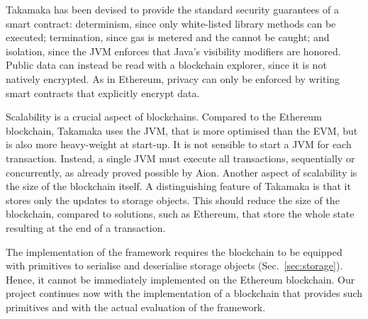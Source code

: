 \documentclass[10pt]{llncs}
\def\codesize{}
\def\<#1>{\codeid{#1}}
\newcommand{\codeid}[1]{\ifmmode{\mbox{\codesize\ttfamily{#1}}}\else{\codesize\ttfamily #1}\fi}
\begin{document}
Takamaka has been devised to provide the standard security guarantees of
a smart contract: determinism, since only white-listed library methods can be
executed; termination, since gas is metered and the \<OutOfGasError> cannot
be caught; and isolation, since the JVM enforces that Java's visibility
modifiers are honored. Public data can instead be read with a blockchain
explorer, since it is not natively encrypted. As in Ethereum, privacy can only be enforced
by writing smart contracts that explicitly encrypt data.

Scalability is a crucial aspect of blockchains. Compared to the Ethereum blockchain,
Takamaka uses the JVM, that is more optimised than the EVM, but is also
more heavy-weight at start-up. It is not sensible to start a JVM for each transaction.
Instead, a single JVM must execute all transactions, sequentially or concurrently,
as already proved possible by Aion. Another aspect of scalability is the size of the
blockchain itself. A distinguishing feature of Takamaka is that it
stores only the updates to storage objects. This should reduce the size of the blockchain,
compared to solutions, such as Ethereum, that store the whole state resulting at the end of
a transaction.

The implementation of the framework requires the blockchain to be
equipped with primitives to serialise and deserialise storage objects
(Sec.~\ref{sec:storage}). Hence, it cannot be immediately implemented on
the Ethereum blockchain. Our project continues now with the
implementation of a blockchain that provides such primitives
and with the actual evaluation of the framework.





\end{document}
